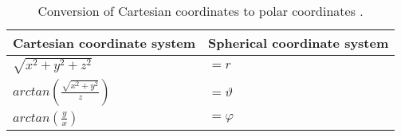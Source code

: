 \begin{table}[H]
\centering
\begin{tabular}{|ll|}
\hline
\textbf{Cartesian coordinate system} & \textbf{Spherical coordinate system}                                                                            \\ \hline
$\sqrt{x^2+y^2+z^2} $                               & $= r$ \\
$arctan( \frac{\sqrt{x^2+y^2}}{z} ) $  & $= \vartheta$ \\ 
$arctan( \frac{y}{x} ) $               & $= \varphi$                                                  \\ \hline
\end{tabular}
\caption{Conversion of Cartesian coordinates to polar coordinates \cite{Bronstein2005TaschenbuchMathematik}. }
\label{table_cart_to_Pol}
\end{table}











